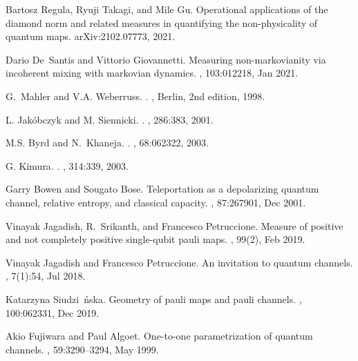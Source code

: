 \documentclass[12pt]{iopart}
\begin{document}
\begin{thebibliography}{10}
Bartosz Regula, Ryuji Takagi, and Mile Gu.
\newblock Operational applications of the diamond norm and related measures in
  quantifying the non-physicality of quantum maps.
\newblock arXiv:2102.07773, 2021.

Dario De~Santis and Vittorio Giovannetti.
\newblock Measuring non-markovianity via incoherent mixing with markovian
  dynamics.
, 103:012218, Jan 2021.

G.~Mahler and V.A. Weberruss.
.
, {Berlin}, 2nd edition, 1998.

{L. Jak\'obczyk and M. Siennicki}.
.
, {286}:{383}, 2001.

M.S. Byrd and N.~Khaneja.
.
, 68:{062322}, 2003.

{G. Kimura}.
.
, {314}:{339}, 2003.

Garry Bowen and Sougato Bose.
\newblock Teleportation as a depolarizing quantum channel, relative entropy,
  and classical capacity.
, 87:267901, Dec 2001.

Vinayak Jagadish, R.~Srikanth, and Francesco Petruccione.
\newblock Measure of positive and not completely positive single-qubit pauli
  maps.
, 99(2), Feb 2019.

Vinayak Jagadish and Francesco Petruccione.
\newblock An invitation to quantum channels.
, 7(1):54, Jul 2018.

Katarzyna Siudzi\ifmmode~\else \'{n}\fi{}ska.
\newblock Geometry of pauli maps and pauli channels.
, 100:062331, Dec 2019.

Akio Fujiwara and Paul Algoet.
\newblock One-to-one parametrization of quantum channels.
, 59:3290--3294, May 1999.


\end{thebibliography}
\end{document}
